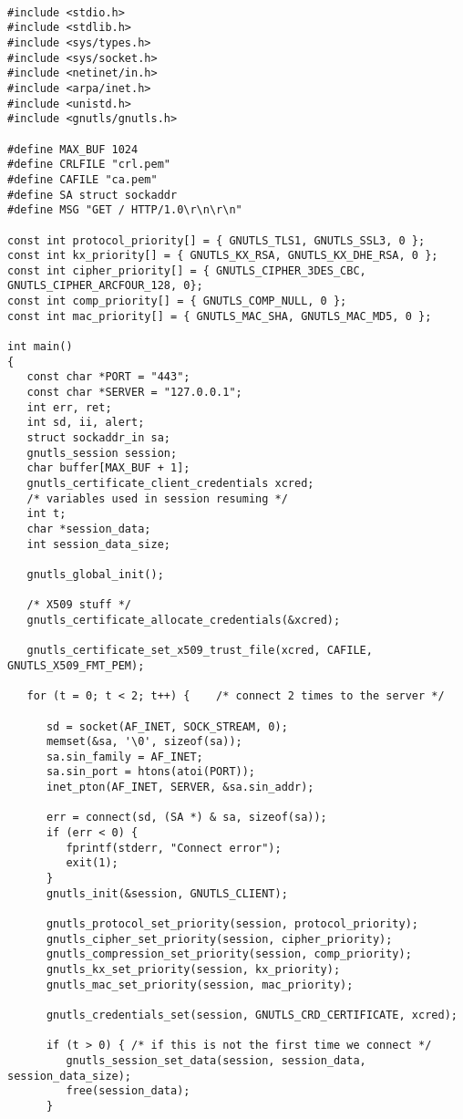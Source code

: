 \begin{verbatim}

#include <stdio.h>
#include <stdlib.h>
#include <sys/types.h>
#include <sys/socket.h>
#include <netinet/in.h>
#include <arpa/inet.h>
#include <unistd.h>
#include <gnutls/gnutls.h>

#define MAX_BUF 1024
#define CRLFILE "crl.pem"
#define CAFILE "ca.pem"
#define SA struct sockaddr
#define MSG "GET / HTTP/1.0\r\n\r\n"

const int protocol_priority[] = { GNUTLS_TLS1, GNUTLS_SSL3, 0 };
const int kx_priority[] = { GNUTLS_KX_RSA, GNUTLS_KX_DHE_RSA, 0 };
const int cipher_priority[] = { GNUTLS_CIPHER_3DES_CBC, GNUTLS_CIPHER_ARCFOUR_128, 0};
const int comp_priority[] = { GNUTLS_COMP_NULL, 0 };
const int mac_priority[] = { GNUTLS_MAC_SHA, GNUTLS_MAC_MD5, 0 };

int main()
{
   const char *PORT = "443";
   const char *SERVER = "127.0.0.1";
   int err, ret;
   int sd, ii, alert;
   struct sockaddr_in sa;
   gnutls_session session;
   char buffer[MAX_BUF + 1];
   gnutls_certificate_client_credentials xcred;
   /* variables used in session resuming */
   int t;
   char *session_data;
   int session_data_size;

   gnutls_global_init();

   /* X509 stuff */
   gnutls_certificate_allocate_credentials(&xcred);

   gnutls_certificate_set_x509_trust_file(xcred, CAFILE, GNUTLS_X509_FMT_PEM);

   for (t = 0; t < 2; t++) {    /* connect 2 times to the server */

      sd = socket(AF_INET, SOCK_STREAM, 0);
      memset(&sa, '\0', sizeof(sa));
      sa.sin_family = AF_INET;
      sa.sin_port = htons(atoi(PORT));
      inet_pton(AF_INET, SERVER, &sa.sin_addr);

      err = connect(sd, (SA *) & sa, sizeof(sa));
      if (err < 0) {
         fprintf(stderr, "Connect error");
         exit(1);
      }
      gnutls_init(&session, GNUTLS_CLIENT);

      gnutls_protocol_set_priority(session, protocol_priority);
      gnutls_cipher_set_priority(session, cipher_priority);
      gnutls_compression_set_priority(session, comp_priority);
      gnutls_kx_set_priority(session, kx_priority);
      gnutls_mac_set_priority(session, mac_priority);

      gnutls_credentials_set(session, GNUTLS_CRD_CERTIFICATE, xcred);

      if (t > 0) { /* if this is not the first time we connect */
         gnutls_session_set_data(session, session_data, session_data_size);
         free(session_data);
      }
      

\end{verbatim}
